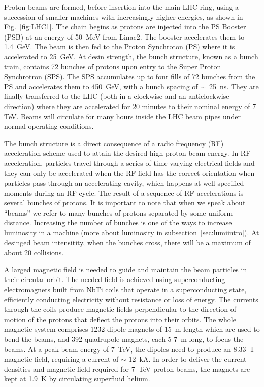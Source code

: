 Proton beams are formed, before insertion into the main LHC ring, using a succession of smaller machines with increasingly  higher energies, as shown in Fig.~\ref{fig:LHC1}. The chain begins as protons are injected into the PS Booster (PSB) at an energy of 50~MeV from Linac2. The booster accelerates them to 1.4~GeV. The beam is then fed to the Proton Synchroton (PS) where it is accelerated to 25~GeV. At desin strength, the bunch structure, known as a bunch train, contains 72 bunches of protons upon entry to the Super Proton Synchrotron (SPS). The SPS accumulates up to four fills of 72 bunches from the PS and accelerates them to 450~GeV, with a bunch spacing of $\sim$~25~ns. They are finally transferred to the LHC (both in a clockwise and an anticlockwise direction) where they are accelerated for 20 minutes to their nominal energy of 7 TeV. Beams will circulate for many hours inside the LHC beam pipes under normal operating conditions.

The bunch structure is a direct consequence of a radio frequency (RF) acceleration scheme used to attain the desired high proton beam energy.  In RF acceleration, particles travel through a series of time-varying electrical fields and they can only be accelerated when the RF field has the correct orientation when particles pass through an accelerating cavity, which happens at well specified moments during an RF cycle. The result of a sequence of RF accelerations is several bunches of protons. It is important to note that when we speak about ``beams'' we refer to many bunches of protons separated by some uniform distance. Increasing the number of bunches is one of the ways to increase luminosity in a machine (more about luminosity in subsection~\ref{sec:lumiintro}). At desinged beam intensitity, when the bunches cross, there will be a maximum of about 20 collisions.

A larged magnetic field is needed to guide and maintain the beam particles in their circular orbit. The needed field is achieved using superconducting electromagnets built from NbTi coils that operate in a superconducting state, efficiently conducting electricity without resistance or loss of energy. The currents through the coils produce magnetic fields perpendicular to the direction of motion of the protons that deflect the protons into their orbits.  The whole magnetic system comprises 1232 dipole magnets of 15~m length which are used to bend the beams, and 392 quadrupole magnets, each 5-7~m long, to focus the beams. At a peak beam energy of 7~TeV, the dipoles need to produce an 8.33~T magnetic field, requiring a current of $\sim$ 12~kA. In order to deliver the current densities and magnetic field required for 7~TeV proton beams, the magnets are kept at 1.9~K by circulating superfluid helium.

